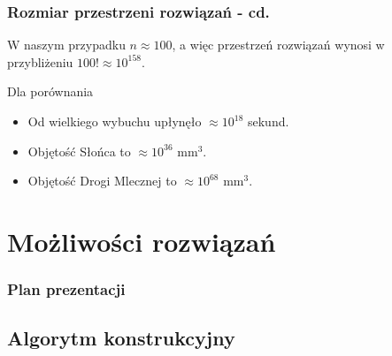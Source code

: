 \documentclass{beamer}
\begin{document}
		\begin{frame}
			\frametitle{Rozmiar przestrzeni rozwiązań - cd.}
			
			W naszym przypadku $n \approx 100$, a więc przestrzeń rozwiązań wynosi w przybliżeniu $100! \approx 10^{158}$. \bigskip
			
			\begin{block}{Dla porównania}
				\begin{itemize}
					\item Od wielkiego wybuchu upłynęło $\approx 10^{18}$ sekund.
					\item Objętość Słońca to $\approx 10^{36}$ mm$^3$.
					\item Objętość Drogi Mlecznej to $\approx 10^{68}$ mm$^3$.
				\end{itemize}
			\end{block}
		\end{frame}
		
\section{Możliwości rozwiązań}

	\begin{frame}
		\frametitle{Plan prezentacji}
		\tableofcontents[currentsection]
	\end{frame}
	
	\subsection{Algorytm konstrukcyjny}
		\begin{frame}
			
		\end{frame}
		
\end{document}
